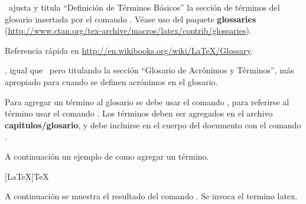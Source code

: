 

\ ajusta y titula ``Definición de Términos Básicos'' la sección de términos del glosario insertada por el comando . Véase uso del paquete \textbf{glossaries} (\url{http://www.ctan.org/tex-archive/macros/latex/contrib/glossaries}).

Referencia rápida en \url{http://en.wikibooks.org/wiki/LaTeX/Glossary}.

, igual que \ pero titulando la sección ``Glosario de Acrónimos y Términos'', más apropiado para cuando se definen acrónimos en el glosario.

Para agregar un término al glosario se debe usar el comando , 
para referirse al término usar el comando . Los términos deben ser agregados en el archivo \textbf{capitulos/glosario}, y debe incluirse en el cuerpo
del documento con el comando .

A continuación un ejemplo de como agregar un término.

\begin{listado}[titulo=Ejemplo de término para el glosario]{[LaTeX]TeX}
\end{listado}

A continuación se muestra el resultado del comando . Se invoca el termino \gls{latex}.

\hacerglosario